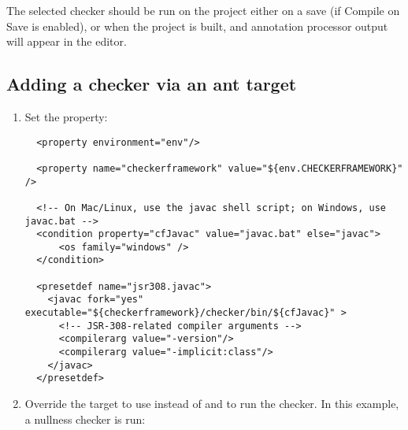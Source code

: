 The selected checker should be run on the project either on a save (if
Compile on Save is enabled), or when the project is built, and
annotation processor output will appear in the editor.


\subsection {Adding a checker via an ant target\label{netbeans-ant-target}}

\begin{enumerate}
\item
Set the  property:

\begin{smaller}
\begin{Verbatim}
  <property environment="env"/>

  <property name="checkerframework" value="${env.CHECKERFRAMEWORK}" />

  <!-- On Mac/Linux, use the javac shell script; on Windows, use javac.bat -->
  <condition property="cfJavac" value="javac.bat" else="javac">
      <os family="windows" />
  </condition>

  <presetdef name="jsr308.javac">
    <javac fork="yes" executable="${checkerframework}/checker/bin/${cfJavac}" >
      <!-- JSR-308-related compiler arguments -->
      <compilerarg value="-version"/>
      <compilerarg value="-implicit:class"/>
    </javac>
  </presetdef>
\end{Verbatim}
\end{smaller}

\item
Override the  target to
use  instead of  and to run the checker.
In this example, a nullness checker is run:


\end{enumerate}

